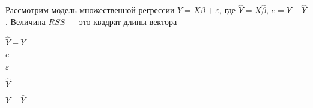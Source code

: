 
\begin{question}
Рассмотрим модель множественной регрессии \(Y=X\beta+\varepsilon\), где
\(\hat Y = X\hat\beta\), \(e=Y-\hat Y\). Величина \(RSS\) --- это
квадрат длины вектора
\begin{answerlist}
  \item \(\hat Y - \bar Y\)
  \item \(e\)
  \item \(\varepsilon\)
  \item \(\hat Y\)
  \item \(Y-\bar Y\)
\end{answerlist}
\end{question}


